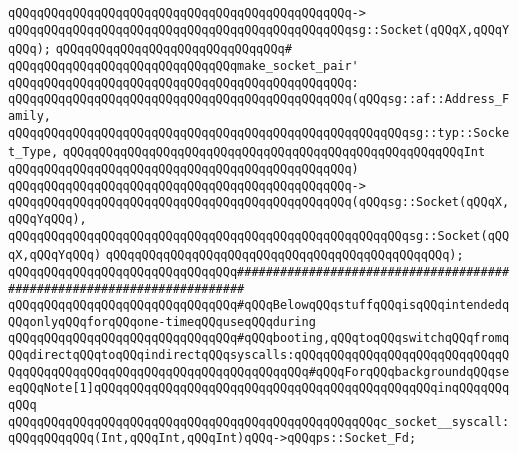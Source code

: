 \verb|qQQqqQQqqQQqqQQqqQQqqQQqqQQqqQQqqQQqqQQqqQQqqQQq->|\newline
\verb|qQQqqQQqqQQqqQQqqQQqqQQqqQQqqQQqqQQqqQQqqQQqqQQqsg::Socket(qQQqX,qQQqYqQQq);|\newline
\verb|qQQqqQQqqQQqqQQqqQQqqQQqqQQqqQQq#|\newline
\verb|qQQqqQQqqQQqqQQqqQQqqQQqqQQqqQQqmake_socket_pair'|\newline
\verb|qQQqqQQqqQQqqQQqqQQqqQQqqQQqqQQqqQQqqQQqqQQqqQQq:|\newline
\verb|qQQqqQQqqQQqqQQqqQQqqQQqqQQqqQQqqQQqqQQqqQQqqQQq(qQQqsg::af::Address_Family,|\newline
\verb|qQQqqQQqqQQqqQQqqQQqqQQqqQQqqQQqqQQqqQQqqQQqqQQqqQQqqQQqsg::typ::Socket_Type,|\newline
\verb|qQQqqQQqqQQqqQQqqQQqqQQqqQQqqQQqqQQqqQQqqQQqqQQqqQQqqQQqInt|\newline
\verb|qQQqqQQqqQQqqQQqqQQqqQQqqQQqqQQqqQQqqQQqqQQqqQQq)|\newline
\verb|qQQqqQQqqQQqqQQqqQQqqQQqqQQqqQQqqQQqqQQqqQQqqQQq->|\newline
\verb|qQQqqQQqqQQqqQQqqQQqqQQqqQQqqQQqqQQqqQQqqQQqqQQq(qQQqsg::Socket(qQQqX,qQQqYqQQq),|\newline
\verb|qQQqqQQqqQQqqQQqqQQqqQQqqQQqqQQqqQQqqQQqqQQqqQQqqQQqqQQqsg::Socket(qQQqX,qQQqYqQQq)|\newline
\verb|qQQqqQQqqQQqqQQqqQQqqQQqqQQqqQQqqQQqqQQqqQQqqQQq);|\newline
\newline
\newline
\verb|qQQqqQQqqQQqqQQqqQQqqQQqqQQqqQQq#######################################################################|\newline
\verb|qQQqqQQqqQQqqQQqqQQqqQQqqQQqqQQq#qQQqBelowqQQqstuffqQQqisqQQqintendedqQQqonlyqQQqforqQQqone-timeqQQquseqQQqduring|\newline
\verb|qQQqqQQqqQQqqQQqqQQqqQQqqQQqqQQq#qQQqbooting,qQQqtoqQQqswitchqQQqfromqQQqdirectqQQqtoqQQqindirectqQQqsyscalls:qQQqqQQqqQQqqQQqqQQqqQQqqQQqqQQqqQQqqQQqqQQqqQQqqQQqqQQqqQQqqQQqqQQqqQQq#qQQqForqQQqbackgroundqQQqseeqQQqNote[1]qQQqqQQqqQQqqQQqqQQqqQQqqQQqqQQqqQQqqQQqqQQqqQQqinqQQqqQQqqQQq|\newline
\newline
\verb|qQQqqQQqqQQqqQQqqQQqqQQqqQQqqQQqqQQqqQQqqQQqqQQqqQQqc_socket__syscall:qQQqqQQqqQQq(Int,qQQqInt,qQQqInt)qQQq->qQQqps::Socket_Fd;|\newline
